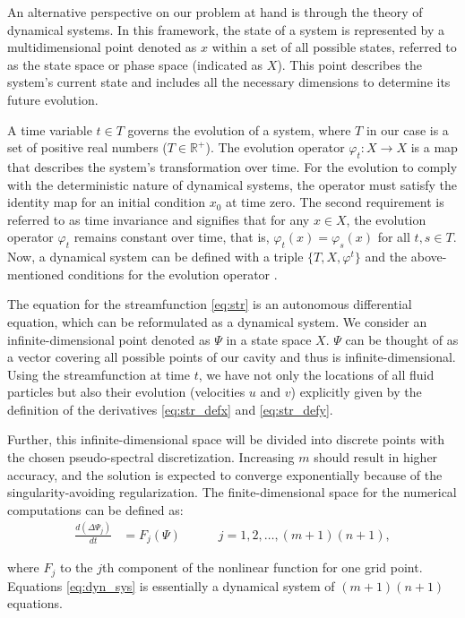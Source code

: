 An alternative perspective on our problem at hand is through the theory of
dynamical systems. In this framework, the state of a system is represented by a
multidimensional point denoted as $x$ within a set of all possible states,
referred to as the state space or phase space (indicated as $X$). This point
describes the system's current state and includes all the necessary dimensions
to determine its future evolution.

A time variable $t \in T$ governs the evolution of a system, where $T$ in our
case is a set of positive real numbers ($T \in \mathbb{R}^+$). The evolution
operator $\varphi_t : X \to X$ is a map that describes the system's
transformation over time. For the evolution to comply with the deterministic
nature of dynamical systems, the operator must satisfy the identity map for an
initial condition $x_0$ at time zero. The second requirement is referred to as
time invariance and signifies that for any $x \in X$, the evolution operator
$\varphi_t$ remains constant over time, that is, $\varphi_t(x) = \varphi_s(x)$
for all $t, s \in T$. Now, a dynamical system can be defined with a triple $\{
T, X, \varphi^t \}$ and the above-mentioned conditions for the evolution
operator \citep{kuznetsov2004}.

The equation for the streamfunction \eqref{eq:str} is an autonomous
differential equation, which can be reformulated as a dynamical system. We
consider an infinite-dimensional point denoted as $\Psi$ in a state space $X$.
$\Psi$ can be thought of as a vector covering all possible points of our cavity
and thus is infinite-dimensional. Using the streamfunction at time $t$, we have
not only the locations of all fluid particles but also their evolution
(velocities $u$ and $v$) explicitly given by the definition of the derivatives
\eqref{eq:str_defx} and \eqref{eq:str_defy}.

Further, this infinite-dimensional space will be divided into discrete points
with the chosen pseudo-spectral discretization. Increasing $m$ should result in
higher accuracy, and the solution is expected to converge exponentially because
of the singularity-avoiding regularization. The finite-dimensional space for
the numerical computations can be defined as:
\begin{align}
  \frac{d(\Delta \Psi_j)}{dt} &= {F_j(\Psi)} \quad \quad \quad
    j= 1,2,\dots,(m+1)(n+1), \label{eq:dyn_sys}
\end{align}

where $F_j$ to the $j$th component of the nonlinear function for one grid
point. Equations \eqref{eq:dyn_sys} is essentially a dynamical system of
$(m+1)(n+1)$ equations.

